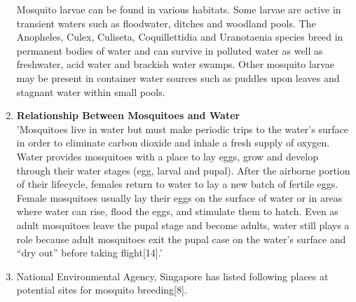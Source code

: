 \documentclass[11pt]{exam}
\begin{document}
\begin{questions}
\begin{enumerate}
Mosquito larvae can be found in various habitats. Some larvae are active in transient waters such as floodwater, ditches and woodland pools. The Anopheles, Culex, Culiseta, Coquillettidia and Uranotaenia species breed in permanent bodies of water and can survive in polluted water as well as freshwater, acid water and brackish water swamps. Other mosquito larvae may be present in container water sources such as puddles upon leaves and stagnant water within small pools.\\

\item \textbf{Relationship Between Mosquitoes and Water} \\
'Mosquitoes live in water but must make periodic trips to the water’s surface in order to eliminate carbon dioxide and inhale a fresh supply of oxygen.\\
Water provides mosquitoes with a place to lay eggs, grow and develop through their water stages (egg, larval and pupal). After the airborne portion of their lifecycle, females return to water to lay a new batch of fertile eggs. Female mosquitoes usually lay their eggs on the surface of water or in areas where water can rise, flood the eggs, and stimulate them to hatch. Even as adult mosquitoes leave the pupal stage and become adults, water still plays a role because adult mosquitoes exit the pupal case on the water’s surface and “dry out” before taking flight[14].' \\
\item National Environmental Agency, Singapore has listed following places at potential sites for mosquito breeding[8].\\

\end{enumerate}
\end{questions}
\end{document}
